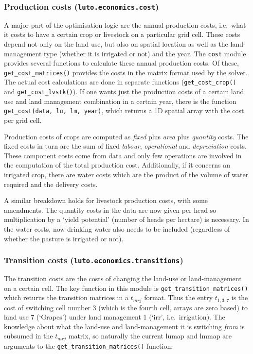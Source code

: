 \documentclass[12pt,a4paper,twoside]{article}
\begin{document}
\subsubsection{Production costs (\texttt{luto.economics.cost})}
A major part of the optimisation logic are the annual production costs, i.e.\ what it costs to have a certain crop or livestock on a particular grid cell. These costs depend not only on the land use, but also on spatial location as well as the land-management type (whether it is irrigated or not) and the year. The \texttt{cost} module provides several functions to calculate these annual production costs. Of these, \texttt{get_cost_matrices()} provides the costs in the matrix format used by the solver. The actual cost calculations are done in separate functions (\texttt{get_cost_crop()} and \texttt{get_cost_lvstk()}). If one wants just the production costs of a certain land use and land management combination in a certain year, there is the function \texttt{get_cost(data, lu, lm, year)}, which returns a 1D spatial array with the cost per grid cell.

Production costs of crops are computed as \emph{fixed} plus \emph{area} plus \emph{quantity} costs. The fixed costs in turn are the sum of fixed \emph{labour}, \emph{operational} and \emph{depreciation} costs. These component costs come from data and only few operations are involved in the computation of the total production cost. Additionally, if it concerns an irrigated crop, there are water costs which are the product of the volume of water required and the delivery costs.

A similar breakdown holds for livestock production costs, with some amendments. The quantity costs in the data are now given per head so multiplication by a `yield potential' (number of heads per hectare) is necessary. In the water costs, now drinking water also needs to be included (regardless of whether the pasture is irrigated or not).

\subsubsection{Transition costs (\texttt{luto.economics.transitions})}
The transition costs are the costs of changing the land-use or land-management on a certain cell. The key function in this module is \texttt{get_transition_matrices()} which returns the transition matrices in a $t_{mrj}$ format. Thus the entry $t_{1, 3, 7}$ is the cost of switching cell number 3 (which is the fourth cell, arrays are zero based) to land use 7 (`Grapes') under land management 1 (`irr', i.e.\ irrigation). The knowledge about what the land-use and land-management it is switching \emph{from} is subsumed in the $t_{mrj}$ matrix, so naturally the current lumap and lmmap are arguments to the \texttt{get_transition_matrices()} function.
\end{document}
